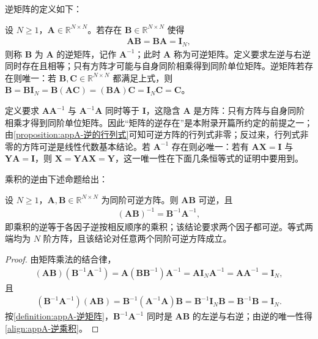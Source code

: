 \documentclass[../main.tex]{subfiles}
\begin{document}
逆矩阵的定义如下：
\begin{definition}[逆矩阵]\label{definition:appA-逆矩阵}
设 $N\geqslant1$，$\bm{A}\in\mathbb{R}^{N\times N}$。若存在 $\bm{B}\in\mathbb{R}^{N\times N}$ 使得
\begin{align}
  \bm{A}\bm{B}=\bm{B}\bm{A}=\bm{I}_{N},
  \label{align:appA-逆定义}
\end{align}
则称 $\bm{B}$ 为 $\bm{A}$ 的逆矩阵，记作 $\bm{A}^{-1}$；此时 $\bm{A}$ 称为可逆矩阵。定义要求左逆与右逆同时存在且相等；只有方阵才可能与自身同阶相乘得到同阶单位矩阵。逆矩阵若存在则唯一：若 $\bm{B},\bm{C}\in\mathbb{R}^{N\times N}$ 都满足上式，则 $\bm{B}=\bm{B}\bm{I}_{N}=\bm{B}(\bm{A}\bm{C})=(\bm{B}\bm{A})\bm{C}=\bm{I}_{N}\bm{C}=\bm{C}$。
\end{definition}

\begin{remark}
定义要求 $\bm{A}\bm{A}^{-1}$ 与 $\bm{A}^{-1}\bm{A}$ 同时等于 $\bm{I}$，这隐含 $\bm{A}$ 是方阵：只有方阵与自身同阶相乘才得到同阶单位矩阵。因此“矩阵的逆存在”是本附录开篇所约定的前提之一；由\cref{proposition:appA-逆的行列式}可知可逆方阵的行列式非零；反过来，行列式非零的方阵可逆是线性代数基本结论。若 $\bm{A}^{-1}$ 存在则必唯一：若有 $\bm{A}\bm{X}=\bm{I}$ 与 $\bm{Y}\bm{A}=\bm{I}$，则 $\bm{X}=\bm{Y}\bm{A}\bm{X}=\bm{Y}$，这一唯一性在下面几条恒等式的证明中要用到。
\end{remark}

乘积的逆由下述命题给出：
\begin{proposition}[乘积的逆]\label{proposition:appA-乘积的逆}
设 $N\geqslant1$，$\bm{A},\bm{B}\in\mathbb{R}^{N\times N}$ 为同阶可逆方阵。则 $\bm{A}\bm{B}$ 可逆，且
\begin{align}
  (\bm{A}\bm{B})^{-1}=\bm{B}^{-1}\bm{A}^{-1},
  \label{align:appA-逆乘积}
\end{align}
即乘积的逆等于各因子逆按相反顺序的乘积；该结论要求两个因子都可逆。等式两端均为 $N$ 阶方阵，且该结论对任意两个同阶可逆方阵成立。
\end{proposition}

\begin{proof}
由矩阵乘法的结合律，
\begin{align*}
 (\bm{A}\bm{B})(\bm{B}^{-1}\bm{A}^{-1})=\bm{A}(\bm{B}\bm{B}^{-1})\bm{A}^{-1}=\bm{A}\bm{I}_{N}\bm{A}^{-1}=\bm{A}\bm{A}^{-1}=\bm{I}_{N},
\end{align*}
且
\begin{align*}
 (\bm{B}^{-1}\bm{A}^{-1})(\bm{A}\bm{B})=\bm{B}^{-1}(\bm{A}^{-1}\bm{A})\bm{B}=\bm{B}^{-1}\bm{I}_{N}\bm{B}=\bm{B}^{-1}\bm{B}=\bm{I}_{N}.
\end{align*}
按\cref{definition:appA-逆矩阵}，$\bm{B}^{-1}\bm{A}^{-1}$ 同时是 $\bm{A}\bm{B}$ 的左逆与右逆；由逆的唯一性得\eqref{align:appA-逆乘积}。
\end{proof}
\end{document}
